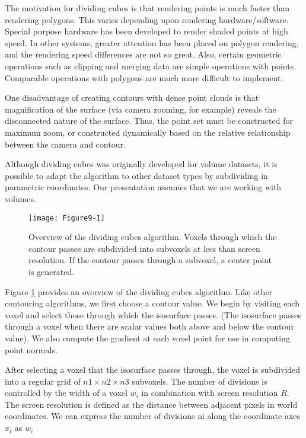 The motivation for dividing cubes is that rendering points is much faster than rendering polygons. This varies depending upon rendering hardware/software. Special purpose hardware has been developed to render shaded points at high speed. In other systems, greater attention has been placed on polygon rendering, and the rendering speed differences are not so great. Also, certain geometric operations such as clipping and merging data are simple operations with points. Comparable operations with polygons are much more difficult to implement.

One disadvantage of creating contours with dense point clouds is that magnification of the surface (via camera zooming, for example) reveals the disconnected nature of the surface. Thus, the point set must be constructed for maximum zoom, or constructed dynamically based on the relative relationship between the camera and contour.

Although dividing cubes was originally developed for volume datasets, it is possible to adapt the algorithm to other dataset types by subdividing in parametric coordinates. Our presentation assumes that we are working with volumes.

\begin{figure}[!htb]
    \centering
    \texttt{[image: Figure9-1]}\\
    \caption{Overview of the dividing cubes algorithm. Voxels through which the contour passes are subdivided into subvoxels at less than screen resolution. If the contour passes through a subvoxel, a center point is generated.}\label{fig:Figure9-1}
\end{figure}

Figure \ref{fig:Figure9-1} provides an overview of the dividing cubes algorithm. Like other contouring algorithms, we first choose a contour value. We begin by visiting each voxel and select those through which the isosurface passes. (The isosurface passes through a voxel when there are scalar values both above and below the contour value). We also compute the gradient at each voxel point for use in computing point normals.

After selecting a voxel that the isosurface passes through, the voxel is subdivided into a regular grid of $n1 \times n2 \times n3$ subvoxels. The number of divisions is controlled by the width of a voxel $w_i$ in combination with screen resolution $R$. The screen resolution is defined as the distance between adjacent pixels in world coordinates. We can express the number of divisions ni along the coordinate axes $x_i$ as $w_i$

